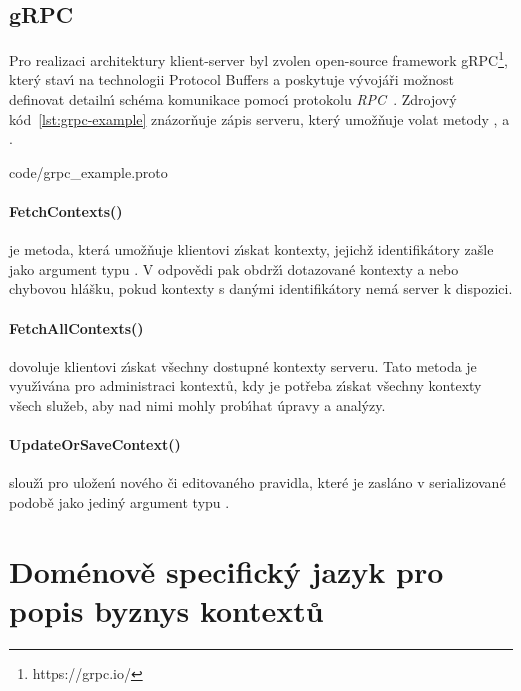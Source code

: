 \subsection{gRPC}

Pro realizaci architektury klient-server byl zvolen
open-source framework gRPC\footnote{https://grpc.io/}, kter\'y stav\'{\i}
na technologii Protocol Buffers a poskytuje v\'yvojáři
možnost definovat detailn\'{\i} schéma komunikace pomoc\'{\i}
protokolu \textit{\gls{RPC}}~\cite{nelson1981remote}.
Zdrojov\'y kód~\ref{lst:grpc-example} znázorňuje zápis serveru,
kter\'y umožňuje volat metody ,
 a .


{code/grpc_example.proto}

\paragraph{FetchContexts()} je metoda, která umožňuje klientovi
z\'{\i}skat kontexty, jejichž identifikátory zašle jako argument
typu .
V odpovědi pak obdrž\'{\i} dotazované kontexty a nebo chybovou hlášku,
pokud kontexty s dan\'ymi identifikátory nemá server k dispozici.

\paragraph{FetchAllContexts()} dovoluje klientovi z\'{\i}skat všechny
dostupné kontexty serveru. Tato metoda je využ\'{\i}vána pro administraci
kontextů, kdy je potřeba z\'{\i}skat všechny kontexty všech služeb, aby
nad nimi mohly prob\'{\i}hat úpravy a anal\'yzy.

\paragraph{UpdateOrSaveContext()} slouž\'{\i} pro uložen\'{\i} nového či
editovaného pravidla, které je zasláno v serializované podobě
jako jedin\'y argument typu .

\section{Doménově specifick\'y jazyk pro popis byznys kontextů}\label{sec:dsl-impl}

